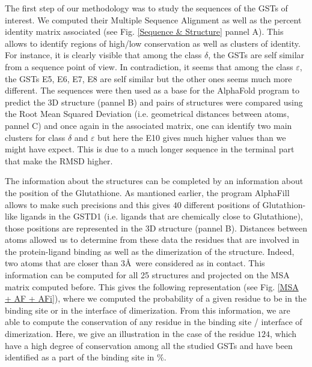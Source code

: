 \noindent The first step of our methodology was to study the sequences of the GSTs of interest. We computed their Multiple Sequence Alignment as well as the percent identity matrix associated (see Fig. \ref{Sequence & Structure} pannel A). This allows to identify regions of high/low conservation as well as clusters of identity. For instance, it is clearly visible that among the class $\delta$, the GSTs are self similar from a sequence point of view. In contradiction, it seems that among the class $\varepsilon$, the GSTs E5, E6, E7, E8 are self similar but the other ones seems much more different. The sequences were then used as a base for the AlphaFold program to predict the 3D structure (pannel B) and pairs of structures were compared using the Root Mean Squared Deviation (i.e. geometrical distances between atoms, pannel C) and once again in the associated matrix, one can identify two main clusters for class $\delta$ and $\varepsilon$ but here the E10 gives much higher values than we might have expect. This is due to a much longer sequence in the terminal part that make the RMSD higher.

\noindent The information about the structures can be completed by an information about the position of the Glutathione. As mantioned earlier, the program AlphaFill allows to make such precisions and this gives $40$ different positions of Glutathion-like ligands in the GSTD1 (i.e. ligands that are chemically close to Glutathione), those positions are represented in the 3D structure (pannel B). Distances between atoms allowed us to determine from these data the residues that are involved in the protein-ligand binding as well as the dimerization of the structure. Indeed, two atoms that are closer than $3$\AA ~were considered as in contact. This information can be computed for all 25 structures and projected on the MSA matrix computed before. This gives the following representation (see Fig. \ref{MSA + AF + AFi}), where we computed the probability of a given residue to be in the binding site or in the interface of dimerization. From this information, we are able to compute the conservation of any residue in the binding site / interface of dimerization. Here, we give an illustration in the case of the residue $124$, which have a high degree of conservation among all the studied GSTs and have been identified as a part of the binding site in $\%$.

